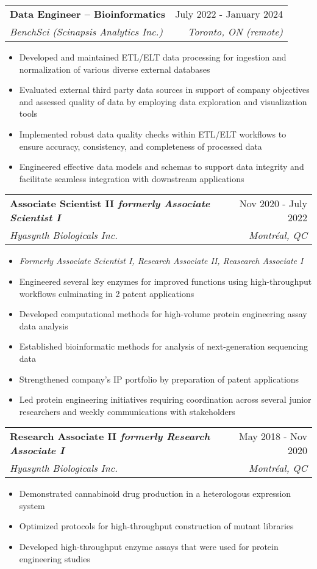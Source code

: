 \documentclass[letterpaper,12pt]{article}
\makeatletter
\newcommand{\resumeItem}[1]{
  \item\small{
    {#1 \vspace{-2pt}}
  }
}
\newcommand{\resumeSubheading}[4]{
  \vspace{-2pt}\item
    \begin{tabular*}{0.97\textwidth}[t]{l@{\extracolsep{\fill}}r}
      \textbf{#1} & #2 \\
      \textit{\small#3} & \textit{\small #4} \\
    \end{tabular*}\vspace{-7pt}
}
\newcommand{\resumeSubSubheading}[2]{
    \item
    \begin{tabular*}{0.97\textwidth}{l@{\extracolsep{\fill}}r}
      \textit{\small#1} & \textit{\small #2} \\
    \end{tabular*}\vspace{-7pt}
}
\newcommand{\resumeSubHeadingListEnd}{\end{itemize}}
\newcommand{\resumeItemListStart}{\begin{itemize}}
\newcommand{\resumeItemListEnd}{\end{itemize}\vspace{-5pt}}
\makeatother
\begin{document}
    \resumeSubheading
      {Data Engineer -- Bioinformatics}{July 2022 - January 2024}
      {BenchSci (Scinapsis Analytics Inc.)}{Toronto, ON \emph(remote)}
      \resumeItemListStart
        \resumeItem{Developed and maintained ETL/ELT data processing for ingestion and normalization of various diverse external databases}
        \resumeItem{Evaluated external third party data sources in support of company objectives and assessed quality of data by employing data exploration and visualization tools}
	  \resumeItem{Implemented robust data quality checks within ETL/ELT workflows to ensure accuracy, consistency, and completeness of processed data}
        \resumeItem{Engineered effective data models and schemas to support data integrity and facilitate seamless integration with downstream applications}
    \resumeItemListEnd 

      

    \resumeSubheading
      {Associate Scientist II \small{\textit{formerly Associate Scientist I}}}{Nov 2020 - July 2022}
      {Hyasynth Biologicals Inc.}{Montréal, QC}
      \resumeItemListStart
       \resumeItem{\emph{Formerly Associate Scientist I, Research Associate II, Reasearch Associate I}}
		\resumeItem{Engineered several key enzymes for improved functions using high-throughput workflows culminating in 2 patent applications}        	
		\resumeItem{Developed computational methods for high-volume protein engineering assay data analysis}
		\resumeItem{Established bioinformatic methods for analysis of next-generation sequencing data}
        	\resumeItem{Strengthened company's IP portfolio by preparation of patent applications}
        	\resumeItem{Led protein engineering initiatives requiring coordination across several junior researchers and weekly communications with stakeholders}
    \resumeItemListEnd

    \resumeSubheading
      {Research Associate II \small{\textit{formerly Research Associate I}}}{May 2018 - Nov 2020}
      {Hyasynth Biologicals Inc.}{Montréal, QC}
      \resumeItemListStart
        \resumeItem{Demonstrated cannabinoid drug production in a heterologous expression system}
        \resumeItem{Optimized protocols for high-throughput construction of mutant libraries}
        \resumeItem{Developed high-throughput enzyme assays that were used for protein engineering studies}
    \resumeItemListEnd
\end{document}
